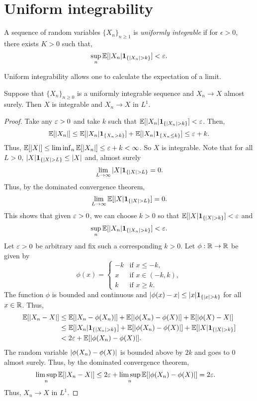 \section{Uniform integrability}
\begin{definition}
    A sequence of random variables $\{X_n\}_{n \ge 1}$ is \emph{uniformly integrable} if for $\epsilon > 0$, there exists $K > 0$ such that,      
    \[\sup_n {\mathbb{E}}[{\left\lvert X_n\right\rvert}{{\bf 1}}_{\{{\left\lvert X_n\right\rvert}>k\}}] < \varepsilon. \]
\end{definition}
Uniform integrability allows one to calculate the expectation of a limit.
\begin{lemma}
    Suppose that $\{X_n\}_{n \ge 0}$ is a uniformly integrable sequence and $X_n \to X$ almost surely. Then $X$ is integrable and $X_n \to X$ in $L^1$.
\end{lemma}
\begin{proof}
    Take any $\varepsilon > 0$ and take $k$ such that ${\mathbb{E}}[{\left\lvert X_n\right\rvert}{{\bf 1}}_{\{{\left\lvert X_n\right\rvert}>k\}}]<\varepsilon$. Then, 
    \[{\mathbb{E}}[{\left\lvert X_n\right\rvert}] \le {\mathbb{E}}[{\left\lvert X_n\right\rvert}{{\bf 1}}_{\{X_n >k\}}] +{\mathbb{E}}[{\left\lvert X_n\right\rvert}{{\bf 1}}_{\{X_n\le k\}}]\le \varepsilon+k. \]
    Thus, ${\mathbb{E}}[{\left\lvert X\right\rvert}] \le \liminf_n {\mathbb{E}}[{\left\lvert X_n\right\rvert}] \le \varepsilon+k<\infty$. So $X$ is integrable. Note that for all $L > 0$, ${\left\lvert X\right\rvert}{{\bf 1}}_{\{{\left\lvert X\right\rvert} > L\}} \le {\left\lvert X\right\rvert}$ and, almost surely 
    \[ \lim_{L \to \infty} {\left\lvert X\right\rvert}{{\bf 1}}_{\{{\left\lvert X\right\rvert}> L\}} = 0.\]
    Thus, by the dominated convergence theorem,
    \[\lim_{L \to \infty} {\mathbb{E}}[{\left\lvert X\right\rvert}{{\bf 1}}_{\{{\left\lvert X\right\rvert}>L\}}] = 0. \]
    This shows that given $\varepsilon > 0$, we can choose $k>0$ so that ${\mathbb{E}}[{\left\lvert X\right\rvert}{{\bf 1}}_{\{{\left\lvert X\right\rvert}>k\}}]<\varepsilon$ and
    \[\sup_n {\mathbb{E}}[{\left\lvert X_n\right\rvert}{{\bf 1}}_{\{{\left\lvert X_n\right\rvert}>k\}}] <\varepsilon.\] 
    Let $\varepsilon > 0$ be arbitrary and fix such a corresponding $k>0$. Let $\phi : {\mathbb R} \to {\mathbb R}$ be given by
    \[\phi(x) = \begin{cases}
        -k & \text{if } x \le -k,\\
        x & \text{if } x \in (-k,k),\\
        k & \text{if } x \ge k.
    \end{cases} \]  
    The function $\phi$ is bounded and continuous and ${\left\lvert\phi(x)-x\right\rvert}\le {\left\lvert x\right\rvert}{{\bf 1}}_{\{{\left\lvert x\right\rvert}>k\}}$ for all $x \in {\mathbb R}$. Thus,
    \begin{align*}
        {\mathbb{E}}[{\left\lvert X_n-X\right\rvert}]&\le {\mathbb{E}}[{\left\lvert X_n-\phi(X_n)\right\rvert}] + {\mathbb{E}}[{\left\lvert\phi(X_n)-\phi(X)\right\rvert}] +{\mathbb{E}}[{\left\lvert\phi(X)-X\right\rvert}]\\
        &\le {\mathbb{E}}[{\left\lvert X_n\right\rvert}{{\bf 1}}_{\{{\left\lvert X_n\right\rvert}> k\}}] + {\mathbb{E}}[{\left\lvert\phi(X_n)-\phi(X)\right\rvert}]+{\mathbb{E}}[{\left\lvert X\right\rvert}{{\bf 1}}_{\{{\left\lvert X\right\rvert} > k\}}]\\
        &< 2\varepsilon + {\mathbb{E}}[{\left\lvert\phi(X_n)-\phi(X)\right\rvert}].
    \end{align*}
    The random variable ${\left\lvert\phi(X_n)-\phi(X)\right\rvert}$ is bounded above by $2k$ and goes to 0 almost surely. Thus, by the dominated convergence theorem,
    \begin{align*}
        \limsup_n {\mathbb{E}}[{\left\lvert X_n-X\right\rvert}] &\le 2\varepsilon + \limsup_n {\mathbb{E}}[{\left\lvert\phi(X_n)-\phi(X)\right\rvert}] = 2\varepsilon.
    \end{align*}
    Thus, $X_n \to X$ in $L^1$.
\end{proof}
